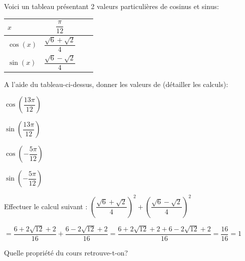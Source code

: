 \documentclass[11pt,a4paper]{article}  %
\begin{document}

Voici un tableau présentant 2 valeurs particulières de cosinus et sinus:\\
\begin{center}
	\begin{tabular}{ | Xc | Xc | }
		\hline
		$x$  & $\dfrac{\pi}{12}$ \rule[-12pt]{0pt}{33pt}\\ \hline
		$\cos(x)$  & $\dfrac{\sqrt{6}+\sqrt{2}}{4}$ \rule[-12pt]{0pt}{33pt}\\ \hline
		$\sin(x)$ & $\dfrac{\sqrt{6}-\sqrt{2}}{4}$  \rule[-12pt]{0pt}{33pt}\\
		\hline  
	\end{tabular}
\end{center}

\begin{enumMet}
	\item A l'aide du tableau-ci-dessus, donner les valeurs de (détailler les calculs):
	\begin{enumMet}
		\item $\cos\left(\dfrac{13\pi}{12}\right)$\quad {}
		\item {} $\sin\left(\dfrac{13\pi}{12}\right)$\quad {}
		\item $\cos\left(-\dfrac{5\pi}{12}\right)$\quad {}
		\item {} $\sin\left(-\dfrac{5\pi}{12}\right)$\quad {}
	\end{enumMet}
	\item 
	\begin{enumMet}
		\item Effectuer le calcul suivant : $\left(\dfrac{\sqrt{6}+\sqrt{2}}{4}\right)^2+\left(\dfrac{\sqrt{6}-\sqrt{2}}{4}\right)^2$
		\begin{corrBox}
			$=\dfrac{6+2\sqrt{12}+2}{16}+\dfrac{6-2\sqrt{12}+2}{16}=\dfrac{6+2\sqrt{12}+2+6-2\sqrt{12}+2}{16}=\dfrac{16}{16}=1$
		\end{corrBox}
		\item Quelle propriété du cours retrouve-t-on?\quad \corr{$\cos^2 x + \sin^2 x = 1$}
	\end{enumMet}
\end{enumMet}
\end{document}
